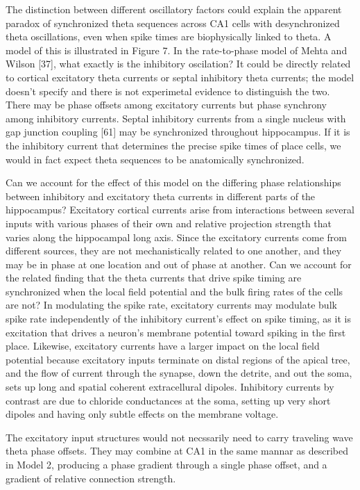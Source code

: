 \documentclass[]{article}
\begin{document}
The distinction between different oscillatory factors could explain the
apparent paradox of synchronized theta sequences across CA1 cells with
desynchronized theta oscillations, even when spike times are
biophysically linked to theta. A model of this is illustrated in Figure
7. In the rate-to-phase model of Mehta and Wilson {[}37{]}, what exactly
is the inhibitory oscilation? It could be directly related to cortical
excitatory theta currents or septal inhibitory theta currents; the model
doesn't specify and there is not experimetal evidence to distinguish the
two. There may be phase offsets among excitatory currents but phase
synchrony among inhibitory currents. Septal inhibitory currents from a
single nucleus with gap junction coupling {[}61{]} may be synchronized
throughout hippocampus. If it is the inhibitory current that determines
the precise spike times of place cells, we would in fact expect theta
sequences to be anatomically synchronized.

Can we account for the effect of this model on the differing phase
relationships between inhibitory and excitatory theta currents in
different parts of the hippocampus? Excitatory cortical currents arise
from interactions between several inputs with various phases of their
own and relative projection strength that varies along the hippocampal
long axis. Since the excitatory currents come from different sources,
they are not mechanistically related to one another, and they may be in
phase at one location and out of phase at another. Can we account for
the related finding that the theta currents that drive spike timing are
synchronized when the local field potential and the bulk firing rates of
the cells are not? In modulating the spike rate, excitatory currents may
modulate bulk spike rate independently of the inhibitory current's
effect on spike timing, as it is excitation that drives a neuron's
membrane potential toward spiking in the first place. Likewise,
excitatory currents have a larger impact on the local field potential
because excitatory inputs terminate on distal regions of the apical
tree, and the flow of current through the synapse, down the detrite, and
out the soma, sets up long and spatial coherent extracellural dipoles.
Inhibitory currents by contrast are due to chloride conductances at the
soma, setting up very short dipoles and having only subtle effects on
the membrane voltage.

The excitatory input structures would not necssarily need to carry
traveling wave theta phase offsets. They may combine at CA1 in the same
mannar as described in Model 2, producing a phase gradient through a
single phase offset, and a gradient of relative connection strength.
\end{document}
